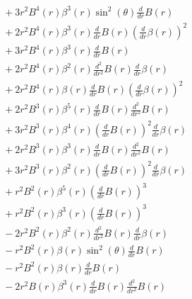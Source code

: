 \documentclass[11pt,a4paper]{article}
\begin{document}
\begin{align*}
  &\quad + 3 r^{2} B^{4}{\left(r \right)} \beta^{3}{\left(r \right)} \sin^{2}{\left(\theta \right)} \frac{d}{d r} B{\left(r \right)} \\
  &\quad + 2 r^{2} B^{4}{\left(r \right)} \beta^{3}{\left(r \right)} \frac{d}{d r} B{\left(r \right)} \left(\frac{d}{d r} \beta{\left(r \right)}\right)^{2} \\
  &\quad + 3 r^{2} B^{4}{\left(r \right)} \beta^{3}{\left(r \right)} \frac{d}{d r} B{\left(r \right)} \\
  &\quad + 2 r^{2} B^{4}{\left(r \right)} \beta^{2}{\left(r \right)} \frac{d^{2}}{d r^{2}} B{\left(r \right)} \frac{d}{d r} \beta{\left(r \right)} \\
  &\quad + 2 r^{2} B^{4}{\left(r \right)} \beta{\left(r \right)} \frac{d}{d r} B{\left(r \right)} \left(\frac{d}{d r} \beta{\left(r \right)}\right)^{2} \\
  &\quad + 2 r^{2} B^{3}{\left(r \right)} \beta^{5}{\left(r \right)} \frac{d}{d r} B{\left(r \right)} \frac{d^{2}}{d r^{2}} B{\left(r \right)} \\
  &\quad + 3 r^{2} B^{3}{\left(r \right)} \beta^{4}{\left(r \right)} \left(\frac{d}{d r} B{\left(r \right)}\right)^{2} \frac{d}{d r} \beta{\left(r \right)} \\
  &\quad + 2 r^{2} B^{3}{\left(r \right)} \beta^{3}{\left(r \right)} \frac{d}{d r} B{\left(r \right)} \frac{d^{2}}{d r^{2}} B{\left(r \right)} \\
  &\quad + 3 r^{2} B^{3}{\left(r \right)} \beta^{2}{\left(r \right)} \left(\frac{d}{d r} B{\left(r \right)}\right)^{2} \frac{d}{d r} \beta{\left(r \right)} \\
  &\quad + r^{2} B^{2}{\left(r \right)} \beta^{5}{\left(r \right)} \left(\frac{d}{d r} B{\left(r \right)}\right)^{3} \\
  &\quad + r^{2} B^{2}{\left(r \right)} \beta^{3}{\left(r \right)} \left(\frac{d}{d r} B{\left(r \right)}\right)^{3} \\
  &\quad - 2 r^{2} B^{2}{\left(r \right)} \beta^{2}{\left(r \right)} \frac{d^{2}}{d r^{2}} B{\left(r \right)} \frac{d}{d r} \beta{\left(r \right)} \\
  &\quad - r^{2} B^{2}{\left(r \right)} \beta{\left(r \right)} \sin^{2}{\left(\theta \right)} \frac{d}{d r} B{\left(r \right)} \\
  &\quad - r^{2} B^{2}{\left(r \right)} \beta{\left(r \right)} \frac{d}{d r} B{\left(r \right)} \\
  &\quad - 2 r^{2} B{\left(r \right)} \beta^{3}{\left(r \right)} \frac{d}{d r} B{\left(r \right)} \frac{d^{2}}{d r^{2}} B{\left(r \right)} \\

\end{align*}
\end{document}
